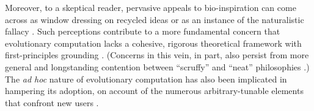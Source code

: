 
Moreover, to a skeptical reader, pervasive appeals to bio-inspiration can come across as window dressing on recycled ideas or as an instance of the naturalistic fallacy \citep{wortmann2020does,sorensen2015metaheuristics}.
Such perceptions contribute to a more fundamental concern that evolutionary computation lacks a cohesive, rigorous theoretical framework with first-principles grounding \citep{worzel2003genetic}.
(Concerns in this vein, in part, also persist from more general and longstanding contention between ``scruffy'' and ``neat'' philosophies \citep[p. 16]{jones2008artificial} \citep{minsky1991logical}.)
The \textit{ad hoc} nature of evolutionary computation has also been implicated in hampering its adoption, on account of the numerous arbitrary-tunable elements that confront new users \citep{oneil2010open}.

